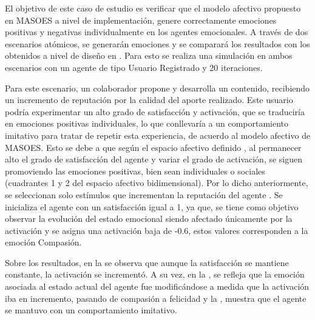 \clearpage
\newpage


El objetivo de este caso de estudio es verificar que el modelo afectivo propuesto en
MASOES a nivel de implementación, genere correctamente emociones positivas y negativas
individualmente en los agentes emocionales. A través de dos escenarios atómicos,
se generarán emociones y se comparará los resultados con los obtenidos
a nivel de diseño en \cite{perozo2012}.
Para esto se realiza una simulación en ambos escenarios con un agente de tipo Usuario Registrado
y 20 iteraciones.


Para este escenario, un colaborador propone y desarrolla un contenido, recibiendo
un incremento de reputación por la calidad del aporte realizado. Este usuario
podría experimentar un alto grado de satisfacción y activación, que se
traduciría en emociones positivas individuales, lo que conllevaría a un
comportamiento imitativo para tratar de repetir esta experiencia,
de acuerdo al modelo afectivo de MASOES. Esto se debe a que según el espacio afectivo definido
, al permanecer alto el grado de satisfacción
del agente y variar el grado de activación, se siguen promoviendo las emociones
positivas, bien sean individuales o sociales (cuadrantes 1 y 2 del espacio
afectivo bidimensional). Por lo dicho anteriormente, se seleccionan
solo estímulos que incrementan la reputación del agente .
Se inicializa el agente con un satisfacción igual a 1, ya que, se tiene como objetivo observar la evolución del estado emocional
siendo afectado únicamente por la activación y se asigna una activación baja de -0.6,
estos valores corresponden a la emoción Compasión.

Sobre los resultados, en la  se observa que
aunque la satisfacción se mantiene constante, la activación se incrementó.
A su vez,
en la , se refleja que
la emoción asociada al estado actual del agente fue modificándose a medida que la activación iba
en incremento, pasando de compasión a felicidad y la ,
muestra que el agente se mantuvo con un comportamiento imitativo.

